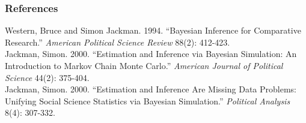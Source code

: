 \documentclass[handout]{beamer}
\begin{document}
\begin{frame}
\frametitle{References}
\pause
\begin{figure}[!htp]
\begin{center}
\pause
{}
\pause
{}
\end{center}
\end{figure}
\pause
\tiny
Western, Bruce and Simon Jackman.  1994.  ``Bayesian Inference for
Comparative Research.''  {\it American Political Science Review}
88(2): 412-423. \\
\bigskip
Jackman, Simon.  2000.  ``Estimation and Inference via Bayesian
Simulation: An Introduction to Markov Chain Monte Carlo.'' {\it
American Journal of Political Science} 44(2): 375-404. \\
\bigskip
Jackman, Simon.  2000. ``Estimation and Inference Are Missing Data
Problems: Unifying Social Science Statistics via Bayesian
Simulation.''  {\it Political Analysis} 8(4): 307-332. \\
\normalsize
\end{frame}
\end{document}
